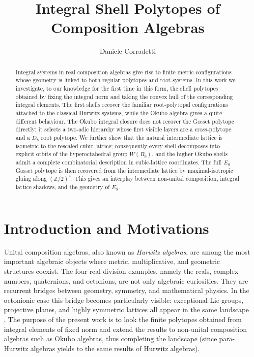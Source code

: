 \documentclass{birkjour}
\title{Integral Shell Polytopes of Composition Algebras}
\author{Daniele Corradetti}
\date{}
\newcommand{\ZZ}{\mathbb Z}
\numberwithin{equation}{section}
\begin{document}
\begin{abstract}
Integral systems in real composition algebras give rise to finite metric
configurations whose geometry is linked to both regular polytopes and root-systems. In this work we investigate, to our knowledge for the first time in
this form, the shell polytopes obtained by fixing the integral norm and taking
the convex hull of the corresponding integral elements. The first shells
recover the familiar root-polytopal configurations attached to the classical
Hurwitz systems, while the Okubo algebra gives a quite different behaviour.
The Okubo integral closure does not recover the Gosset polytope directly: it
selects a two-adic hierarchy whose first visible layers are a cross-polytope
and a \(D_8\) root polytope. We further show that the natural intermediate
lattice  is isometric to the rescaled cubic lattice; consequently every shell  decomposes into explicit
orbits of the hyperoctahedral group \(W(B_8)\), and the higher Okubo shells  admit a complete combinatorial description in
cubic-lattice coordinates. The full \(E_8\) Gosset polytope is then recovered
from the intermediate lattice by maximal-isotropic gluing along \((\ZZ/2)^4\). This gives an
interplay between non-unital composition, integral lattice shadows, and the
geometry of \(E_8\).
\end{abstract}

\maketitle

\section{Introduction and Motivations}

Unital composition algebras, also known as \emph{Hurwitz algebras}, are among
the most important algebraic objects where metric, multiplicative, and
geometric structures coexist. The four real division examples, namely the
reals, complex numbers, quaternions, and octonions, are not only algebraic
curiosities. They are recurrent bridges between geometry, symmetry, and
mathematical physics. In the octonionic case this bridge becomes particularly
visible: exceptional Lie groups, projective planes, and
highly symmetric lattices all appear in the same landscape
\cite{baez-octonions,springer-veldkamp,MCCAI23-Rosenfeld,CMZ25-Collineations}.
The purpose of the present work is to look the finite polytopes obtained from integral elements of
fixed norm and extend the results to non-unital composition algebras such as Okubo algebras\cite{CMZ24-MinimalCayley,ElduqueComposition}, thus completing the landscape (since para-Hurwitz algebras yields to the same results of Hurwitz algebras).
\end{document}
